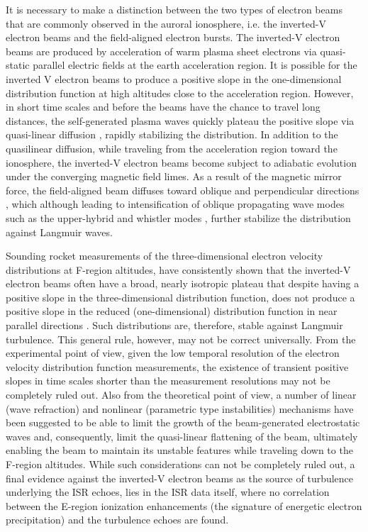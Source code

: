 It is necessary to make a distinction between the two types of electron beams that are commonly observed in the auroral ionosphere, i.e. the inverted-V electron beams and the field-aligned electron bursts. 
The inverted-V electron beams are produced by acceleration of warm plasma sheet electrons via quasi-static parallel electric fields at the earth acceleration region. 
It is possible for the inverted V electron beams to produce a positive slope in the one-dimensional distribution function at high altitudes close to the acceleration region. 
However, in short time scales and before the beams have the chance to travel long distances, the self-generated plasma waves quickly plateau the positive slope via  quasi-linear diffusion \citep{sanbonmatsu2001}, rapidly stabilizing the distribution. 
In addition to the quasilinear diffusion, while traveling from the acceleration region toward the ionosphere, the inverted-V electron beams become subject to adiabatic evolution under the converging magnetic field limes. 
As a result of the magnetic mirror force, the field-aligned beam diffuses toward oblique and perpendicular directions \citep{maggs1981}, which although leading to intensification of oblique propagating wave modes such as the upper-hybrid and whistler modes \citep{maggs1978,kaufmann1980,maggs1981}, further stabilize the distribution against Langmuir waves. 

Sounding rocket measurements of the three-dimensional electron velocity distributions at F-region altitudes, have consistently shown that the inverted-V electron beams often have a broad, nearly isotropic plateau that despite having a positive slope in the three-dimensional distribution function, does not produce a positive slope in the reduced (one-dimensional) distribution function in near parallel directions \citep{kaufmann1978,kaufmann1980,mcfadden1986}.
Such distributions are, therefore, stable against Langmuir turbulence. 
This general rule, however, may not be correct universally. 
From the experimental point of view, given the low temporal resolution of the electron velocity distribution function measurements, the existence of transient positive slopes in time scales shorter than the measurement resolutions may not be completely ruled out. 
Also from the theoretical point of view, a number of linear (wave refraction) \citep{maggs1978} and nonlinear (parametric type instabilities) \citep{papad1974} mechanisms have been suggested to be able to limit the growth of the beam-generated electrostatic waves and, consequently, limit the quasi-linear flattening of the beam, ultimately enabling the beam to maintain its unstable features while traveling down to the F-region altitudes. 
While such considerations can not be completely ruled out, a final evidence against the inverted-V electron beams as the source of turbulence underlying the ISR echoes, lies in the ISR data itself, where no correlation between the E-region ionization enhancements (the signature of energetic electron precipitation) and the turbulence echoes are found.

